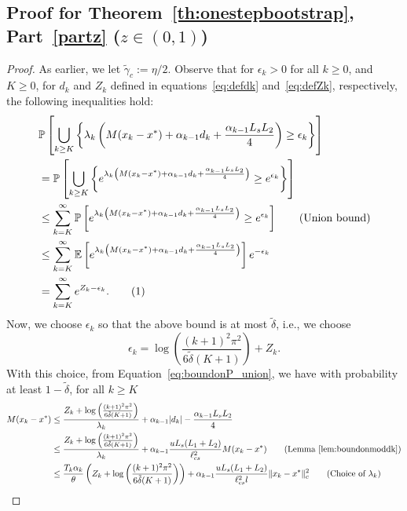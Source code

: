 \documentclass{article}
\newcommand{\numberthis}{\addtocounter{equation}{1}\tag{\theequation}}
\newcommand{\lrp}[1]{\left( #1 \right)}
\newcommand{\lrs}[1]{\left[ #1 \right]}
\newcommand{\E}[1]{\mathbb{E}\lrs{#1}}
\newcommand{\Prob}[1]{\mathbb{P}\lrs{#1}}
\newcommand{\lcs}{\ell_{cs}}
\begin{document}
\subsection{Proof for Theorem~\ref{th:onestepbootstrap}, Part~\ref{partz} ($z \in (0,1)$)}\label{app:proof_onestepbootstrappartz}
\begin{proof}
As earlier, we let $\tilde{\gamma}_c := \eta/2$.   Observe that for  $\epsilon_k > 0$ for all $k\ge 0$, and $K \ge 0$, for $d_k$ and $Z_k$ defined in equations~\eqref{eq:defdk} and~\eqref{eq:defZk}, respectively, the following inequalities hold: 
\begin{align*}
    &\Prob{\bigcup\limits_{k\ge K}\left\{ \lambda_k \lrp{M(x_k- x^*) + \alpha_{k-1}d_k + \frac{\alpha_{k-1} L_sL_2}{4} }  \ge \epsilon_k \right\} }\\
    & = \Prob{\bigcup\limits_{k\ge K} \left\{ e^{\lambda_k \lrp{M(x_k- x^*) + \alpha_{k-1}d_k + \frac{\alpha_{k-1} L_s L_2}{4} } } \ge e^{\epsilon_k} \right\} } \\
    &\le \sum\limits_{k=K}^\infty \Prob{ e^{\lambda_k \lrp{M(x_k- x^*) + \alpha_{k-1}d_k + \frac{\alpha_{k-1} L_s L_2}{4} }} \ge e^{\epsilon_k} }  \tag{Union bound}\\
    &\le \sum\limits_{k=K}^\infty \E{ e^{\lambda_k \lrp{M(x_k- x^*) + \alpha_{k-1}d_k + \frac{\alpha_{k-1} L_s L_2}{4} }}}e^{-\epsilon_k} \\
    &= \sum\limits_{k=K}^\infty e^{Z_k - \epsilon_k} . \numberthis\label{eq:boundonP_union}
\end{align*}
Now, we choose $\epsilon_k$ so that the above bound is at most $\tilde{\delta} $, i.e., we choose
\[ \epsilon_k = \log\left(\frac{(k+1)^2 \pi^2}{6\tilde{\delta}(K+1)}\right) + Z_k. \]
With this choice, from Equation~\eqref{eq:boundonP_union}, we have  with probability at least $1-\tilde{\delta}$, for all $k\ge K$
\begin{align*} 
    M(x_k - x^*) 
    &\le \frac{Z_k + \log\left(\frac{(k+1)^2 \pi^2}{6\tilde{\delta} (K+1)}\right)}{\lambda_k} 
    + \alpha_{k-1}|d_k| - \frac{\alpha_{k-1} L_sL_2}{4} \\
    &\le \frac{Z_k + \log\left(\frac{(k+1)^2 \pi^2}{6\tilde{\delta} (K+1)}\right)}{\lambda_k} 
    + \alpha_{k-1}\frac{u L_s (L_1 + L_2)}{\lcs^2} M(x_k - x^*) \tag{Lemma~\ref{lem:boundonmoddk}}\\
    &\le \frac{T_k \alpha_k}{\theta}\lrp{Z_k + \log\left(\frac{(k+1)^2 \pi^2}{6\tilde{\delta} (K+1)}\right)} 
    + \alpha_{k-1}\frac{u L_s (L_1 + L_2)}{\lcs^2 l} \|x_k - x^*\|^2_c \tag{Choice of $\lambda_k$}\\

\end{align*}
\end{proof}
\end{document}
